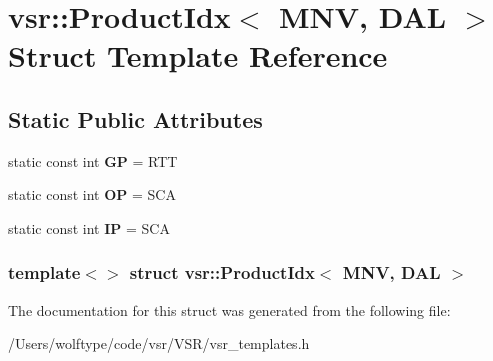\hypertarget{structvsr_1_1_product_idx_3_01_m_n_v_00_01_d_a_l_01_4}{\section{vsr\-:\-:Product\-Idx$<$ M\-N\-V, D\-A\-L $>$ Struct Template Reference}
\label{structvsr_1_1_product_idx_3_01_m_n_v_00_01_d_a_l_01_4}
}
\subsection*{Static Public Attributes}
\begin{DoxyCompactItemize}
\item 
\hypertarget{structvsr_1_1_product_idx_3_01_m_n_v_00_01_d_a_l_01_4_a6d2748bf4b0042bdb0d5df30773b2a01}{static const int {\bfseries G\-P} = R\-T\-T}\label{structvsr_1_1_product_idx_3_01_m_n_v_00_01_d_a_l_01_4_a6d2748bf4b0042bdb0d5df30773b2a01}

\item 
\hypertarget{structvsr_1_1_product_idx_3_01_m_n_v_00_01_d_a_l_01_4_a777441ee2de69205d138c2f50cfad3e6}{static const int {\bfseries O\-P} = S\-C\-A}\label{structvsr_1_1_product_idx_3_01_m_n_v_00_01_d_a_l_01_4_a777441ee2de69205d138c2f50cfad3e6}

\item 
\hypertarget{structvsr_1_1_product_idx_3_01_m_n_v_00_01_d_a_l_01_4_a795ae6678fb0df2a53d2d3963d67618b}{static const int {\bfseries I\-P} = S\-C\-A}\label{structvsr_1_1_product_idx_3_01_m_n_v_00_01_d_a_l_01_4_a795ae6678fb0df2a53d2d3963d67618b}

\end{DoxyCompactItemize}
\subsubsection*{template$<$$>$ struct vsr\-::\-Product\-Idx$<$ M\-N\-V, D\-A\-L $>$}



The documentation for this struct was generated from the following file\-:\begin{DoxyCompactItemize}
\item 
/\-Users/wolftype/code/vsr/\-V\-S\-R/vsr\-\_\-templates.\-h\end{DoxyCompactItemize}
